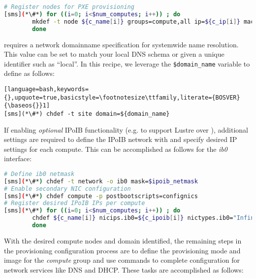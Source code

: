 \begin{lstlisting}[language=bash,keywords={},upquote=true,basicstyle=\footnotesize\ttfamily,]
# Register nodes for PXE provisioning 
[sms](*\#*) for ((i=0; i<$num_computes; i++)) ; do
		mkdef -t node ${c_name[i]} groups=compute,all ip=${c_ip[i]} mac=${c_mac[i]} netboot=pxe
        done
\end{lstlisting}

\noindent \xCAT{} requires a network domainname specification for systemwide name
resolution. This value can be set to match your local DNS schema or given a
unique identifier such as ``local''. In this recipe, we leverage the
\texttt{\$domain\_name} variable to define as follows:

\begin{lstlisting}[language=bash,keywords={},upquote=true,basicstyle=\footnotesize\ttfamily,literate={BOSVER}{\baseos{}}1]
[sms](*\#*) chdef -t site domain=${domain_name}
\end{lstlisting}

\clearpage
If enabling {\em optional} IPoIB functionality (e.g. to support Lustre over \InfiniBand{}), additional
settings are required to define the IPoIB network with \xCAT{} and specify
desired IP settings for each compute. This can be accomplished as follows for
the {\em ib0} interface:

\begin{lstlisting}[language=bash,keywords={},upquote=true,basicstyle=\footnotesize\ttfamily]
# Define ib0 netmask
[sms](*\#*) chdef -t network -o ib0 mask=$ipoib_netmask
# Enable secondary NIC configuration
[sms](*\#*) chdef compute -p postbootscripts=confignics
# Register desired IPoIB IPs per compute
[sms](*\#*) for ((i=0; i<$num_computes; i++)) ; do
		chdef ${c_name[i]} nicips.ib0=${c_ipoib[i]} nictypes.ib0="InfiniBand" nicnetworks.ib0=ib0
        done
\end{lstlisting}

With the desired compute nodes and domain identified, the remaining steps in the
provisioning configuration process are to define the provisioning mode and
image for the {\em compute} group and use \xCAT{} commands to complete
configuration for network services like DNS and DHCP. These tasks are
accomplished as follows:

